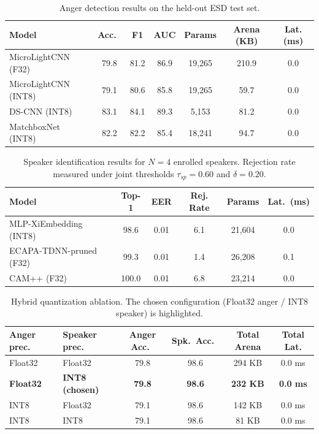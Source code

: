 
\begin{table}[t]
\centering
\caption{Anger detection results on the held-out ESD test set.}
\label{tab:anger_results}
\begin{tabular}{lcccccc}
\toprule
Model & Acc.\ & F1 & AUC & Params & Arena (KB) & Lat. (ms) \\
\midrule
MicroLightCNN (F32) & 79.8 & 81.2 & 86.9 & 19,265 & 210.9 & 0.0 \\
MicroLightCNN (INT8) & 79.1 & 80.6 & 85.8 & 19,265 & 59.7 & 0.0 \\
DS-CNN (INT8) & 83.1 & 84.1 & 89.3 & 5,153 & 81.2 & 0.0 \\
MatchboxNet (INT8) & 82.2 & 82.2 & 85.4 & 18,241 & 94.7 & 0.0 \\
\bottomrule
\end{tabular}
\end{table}



\begin{table}[t]
\centering
\caption{Speaker identification results for $N=4$ enrolled speakers. Rejection rate measured under joint thresholds $\tau_{sp}=0.60$ and $\delta=0.20$.}
\label{tab:speaker_results}
\begin{tabular}{lccccc}
\toprule
Model & Top-1 & EER & Rej. Rate & Params & Lat.\ (ms) \\
\midrule
MLP-XiEmbedding (INT8) & 98.6 & 0.01 & 6.1 & 21,604 & 0.0 \\
ECAPA-TDNN-pruned (F32) & 99.3 & 0.01 & 1.4 & 26,208 & 0.1 \\
CAM++ (F32) & 100.0 & 0.01 & 6.8 & 23,214 & 0.0 \\
\bottomrule
\end{tabular}
\end{table}



\begin{table}[t]
\centering
\caption{Hybrid quantization ablation. The chosen configuration (Float32 anger / INT8 speaker) is highlighted.}
\label{tab:quant_ablation}
\begin{tabular}{llcccc}
\toprule
Anger prec.\ & Speaker prec.\ & Anger Acc.\ & Spk.\ Acc.\ & Total Arena & Total Lat. \\
\midrule
Float32 & Float32 & 79.8 & 98.6 & 294 KB & 0.0 ms \\
\textbf{Float32} & \textbf{INT8 (chosen)} & \textbf{79.8} & \textbf{98.6} & \textbf{232 KB} & \textbf{0.0 ms} \\
INT8 & Float32 & 79.1 & 98.6 & 142 KB & 0.0 ms \\
INT8 & INT8 & 79.1 & 98.6 & 81 KB & 0.0 ms \\
\bottomrule
\end{tabular}
\end{table}


